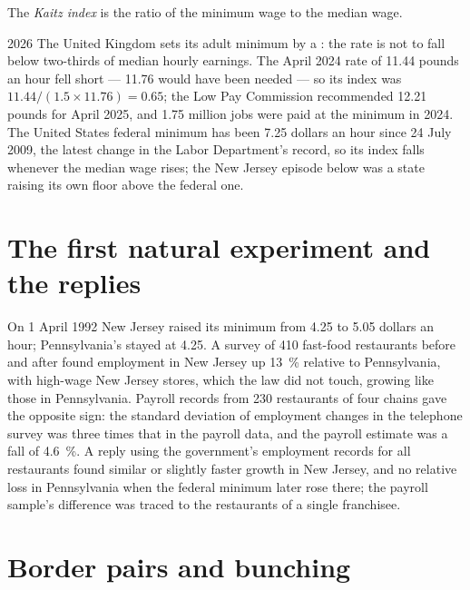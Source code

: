\begin{definition}\label{def:b3:minimum-wage:kaitz}
The \emph{Kaitz index} is the ratio of the minimum wage to the median wage.
\end{definition}

\begin{dated}{2026}
The United Kingdom sets its adult minimum by a : the rate is not to fall below
two-thirds of median hourly earnings. The April 2024 rate of 11.44 pounds an hour fell
short --- 11.76 would have been needed --- so its index was $11.44/(1.5 \times 11.76) = 0.65$; the Low
Pay Commission recommended 12.21 pounds for April 2025, and 1.75 million jobs were paid
at the minimum in 2024. %
The United States federal minimum has been 7.25 dollars an hour since 24 July 2009,
the latest change in the Labor Department's record, so its index falls whenever the
median wage rises; the New Jersey episode below was a state raising its own floor
above the federal one. %
\end{dated}

\section{The first natural experiment and the replies}\label{sec:b3:minimum-wage:nj}

\begin{record}
On 1 April 1992 New Jersey raised its minimum from 4.25 to 5.05 dollars an hour; Pennsylvania's
stayed at 4.25. A survey of 410 fast-food restaurants before and after found employment
in New Jersey up 13~\% relative to Pennsylvania, with high-wage New Jersey stores, which
the law did not touch, growing like those in Pennsylvania. %
Payroll records from 230 restaurants of four chains gave the opposite sign: the
standard deviation of employment changes in the telephone survey was three times that in the
payroll data, and the payroll estimate was a fall of 4.6~\%. %
A reply using the government's employment records for all restaurants found
similar or slightly faster growth in New Jersey, and no relative loss in Pennsylvania
when the federal minimum later rose there; the payroll sample's difference was traced
to the restaurants of a single franchisee. %
\end{record}

\section{Border pairs and bunching}\label{sec:b3:minimum-wage:designs}

